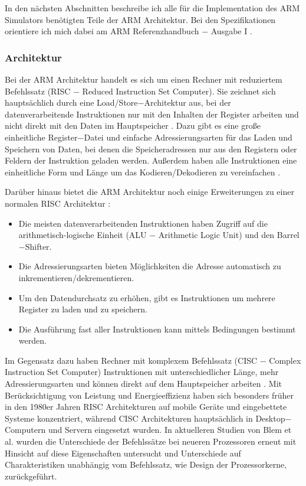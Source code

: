 \documentclass[a4paper, 11pt, onecolumn]{article}
\begin{document}
In den nächsten Abschnitten beschreibe ich alle für die Implementation des ARM Simulators benötigten Teile der ARM Architektur. Bei den Spezifikationen orientiere ich mich dabei am ARM Referenzhandbuch $-$ Ausgabe I \cite{arm:2005}.

\subsubsection{Architektur}\label{sec:architecture}

Bei der ARM Architektur handelt es sich um einen Rechner mit reduziertem Befehlssatz (RISC $-$ Reduced Instruction Set Computer). Sie zeichnet sich hauptsächlich durch eine Load/Store$-$Architektur aus, bei der datenverarbeitende Instruktionen nur mit den Inhalten der Register arbeiten und nicht direkt mit den Daten im Hauptspeicher \cite{risc}. Dazu gibt es eine große einheitliche Register$-$Datei und einfache Adressierungsarten für das Laden und Speichern von Daten, bei denen die Speicheradressen nur aus den Registern oder Feldern der Instruktion geladen werden. Außerdem haben alle Instruktionen eine einheitliche Form und Länge um das Kodieren/Dekodieren zu vereinfachen \cite{arm:2005, risc}.

Darüber hinaus bietet die ARM Architektur noch einige Erweiterungen zu einer normalen RISC Architektur \cite{arm:2005}: 

\begin{itemize}
\item Die meisten datenverarbeitenden Instruktionen haben Zugriff auf die arithmetisch-logische Einheit (ALU $-$ Arithmetic Logic Unit) und den Barrel$-$Shifter.
\item Die Adressierungsarten bieten Möglichkeiten die Adresse automatisch zu inkrementieren/dekrementieren.
\item Um den Datendurchsatz zu erhöhen, gibt es Instruktionen um mehrere Register zu laden und zu speichern. 
\item Die Ausführung fast aller Instruktionen kann mittels Bedingungen bestimmt werden.
\end{itemize}
 
Im Gegensatz dazu haben Rechner mit komplexem Befehlssatz (CISC $-$ Complex Instruction Set Computer) Instruktionen mit unterschiedlicher Länge, mehr Adressierungsarten und können direkt auf dem Hauptspeicher arbeiten \cite{risc}. Mit Berücksichtigung von Leistung und Energieeffizienz haben sich besonders früher in den 1980er Jahren RISC Architekturen auf mobile Geräte und eingebettete Systeme konzentriert, während CISC Architekturen hauptsächlich in Desktop$-$Computern und Servern eingesetzt wurden. In aktuelleren Studien von Blem et al. \cite{risc} wurden die Unterschiede der Befehlssätze bei neueren Prozessoren erneut mit Hinsicht auf diese Eigenschaften untersucht und Unterschiede auf Charakteristiken unabhängig vom Befehlssatz, wie Design der Prozessorkerne, zurückgeführt.
\end{document}
